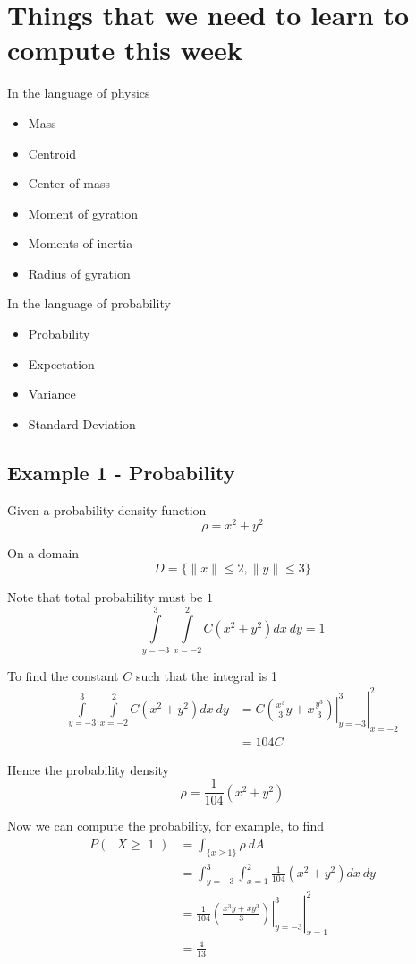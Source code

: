 \section{Things that we need to learn to compute this week}
In the language of physics
\begin{itemize}
   \item Mass
   \item Centroid
   \item Center of mass
   \item Moment of gyration
   \item Moments of inertia
   \item Radius of gyration
\end{itemize}

In the language of probability
\begin{itemize}
   \item Probability
   \item Expectation
   \item Variance
   \item Standard Deviation
\end{itemize}

\subsection{Example 1 - Probability}

Given a probability density function \[
   \rho = x^2 + y^2 
\] 

On a domain \[D = \{ \lVert x \rVert \leq 2, \lVert y \rVert \leq 3 \} \]

Note that total probability must be $1$
 \[
    \int \limits_{y = -3}^{3} \int \limits_{x = -2}^{2} C(x^2 + y^2) dx\ dy = 1
\] 

To find the constant $C$ such that the integral is 1
\begin{align*}
   \int \limits_{y = -3}^{3} \int \limits_{x = -2}^{2} C(x^2 + y^2) dx\ dy &= 
   \left. \left. C \left( \frac{x^3}{3}y + x \frac{y^3}{3} \right) \right|_{y = -3}^{3}  \right|_{x=-2}^{2} \\
                                                                           &= 104C
\end{align*}

Hence the probability density \[
  \rho = \frac{1}{104} \left( x^2 + y^2 \right) 
\] 

Now we can compute the probability, for example, to find
\begin{align*}
   P(\text{ $X \geq$ 1 }) &= \int_{\{ x \geq 1 \}} \rho\ dA  \\
                          & = \int_{y=-3}^{3} \int_{x=1}^{2} \frac{1}{104} \left( x^2 + y^2 \right) dx\ dy \\
                          &= \left. \left. \frac{1}{104} \left( \frac{x^3 y + xy^3}{3}\right)  \right|_{y=-3}^{3} \right|_{x=1}^{2}  \\
                          &= \frac{4}{13}
\end{align*}

